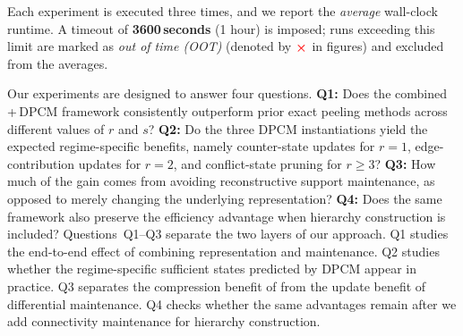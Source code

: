 Each experiment is executed three times, and we report the \emph{average} wall-clock runtime. 
A timeout of \textbf{3600\,seconds} (1 hour) is imposed; runs exceeding this limit are marked as \emph{out of time (OOT)} (denoted by $\textcolor{red}{\boldsymbol{\times}}$ in figures) and excluded from the averages.

Our experiments are designed to answer four questions.
%
\textbf{Q1:} Does the combined \cpi\,+\,DPCM framework consistently outperform prior exact peeling methods across different values of $r$ and $s$?
%
\textbf{Q2:} Do the three DPCM instantiations yield the expected regime-specific benefits, namely counter-state updates for $r{=}1$, edge-contribution updates for $r{=}2$, and conflict-state pruning for $r{\ge}3$?
%
\textbf{Q3:} How much of the gain comes from avoiding reconstructive support maintenance, as opposed to merely changing the underlying representation?
%
\textbf{Q4:} Does the same framework also preserve the efficiency advantage when hierarchy construction is included?
%
Questions~Q1--Q3 separate the two layers of our approach.
%
Q1 studies the end-to-end effect of combining representation and maintenance.
%
Q2 studies whether the regime-specific sufficient states predicted by DPCM appear in practice.
%
Q3 separates the compression benefit of \cpi from the update benefit of differential maintenance.
%
Q4 checks whether the same advantages remain after we add connectivity maintenance for hierarchy construction.



